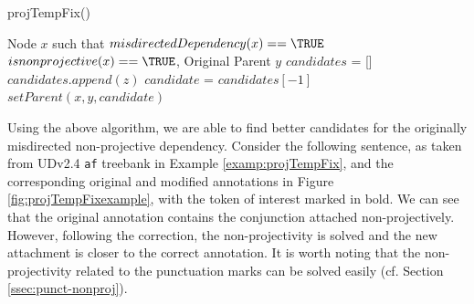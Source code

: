 \begin{algorithm}[H]
\caption{projTempFix()}
\label{algo:conj-head-nonproj}
\begin{algorithmic}[1]
\REQUIRE Node $x$ such that $misdirectedDependency(x) == \TRUE$ \AND $isnonprojective(x) == \TRUE$, Original Parent $y$
\STATE $candidates$ = []
\STATE {}
        \STATE $candidates.append(z)$
        \STATE {}
    \ENDIF
\ENDFOR
\STATE {}
    \RETURN \FALSE
\ELSE
    \STATE $candidate$ = $candidates[-1]$
    \STATE {}
    \RETURN $setParent(x, y, candidate)$
\ENDIF
\end{algorithmic}
\end{algorithm}

Using the above algorithm, we are able to find better candidates for the originally misdirected non-projective dependency. Consider the following sentence, as taken from UDv2.4 \verb|af| treebank in Example \ref{examp:projTempFix}, and the corresponding original and modified annotations in Figure \ref{fig:projTempFixexample}, with the token of interest marked in bold. We can see that the original annotation contains the conjunction attached non-projectively. However, following the correction, the non-projectivity is solved and the new attachment is closer to the correct annotation. It is worth noting that the non-projectivity related to the punctuation marks can be solved easily (cf. Section \ref{ssec:punct-nonproj}).

